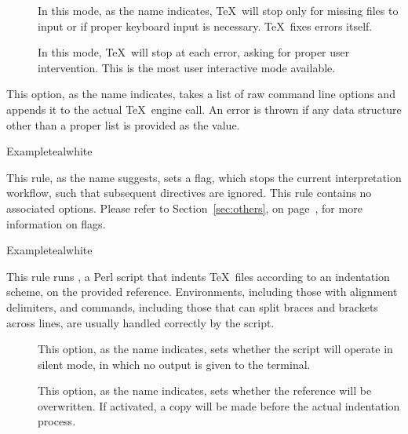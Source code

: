 \begin{description}
\begin{description}
\begin{description}
\item[] In this mode, as the name indicates, \TeX\ will stop only for missing files to input or if proper keyboard input is necessary. \TeX\ fixes errors itself.

\item[] In this mode, \TeX\ will stop at each error, asking for proper user intervention. This is the most user interactive mode available.
\end{description}

\item[\abox{options}] This option, as the name indicates, takes a list of raw command line options and appends it to the actual \TeX\ engine call. An error is thrown if any data structure other than a proper list is provided as the value.
\end{description}

\begin{codebox}{Example}{teal}{\icnote}{white}
\end{codebox}

\item[\rulebox{halt}]
This rule, as the name suggests, sets a  flag, which stops the current interpretation workflow, such that subsequent directives are ignored. This rule contains no associated options. Please refer to Section~\ref{sec:others}, on page~\pageref{sec:others}, for more information on flags.

\begin{codebox}{Example}{teal}{\icnote}{white}
\end{codebox}

\item[\rulebox{indent}]
This rule runs , a Perl script that indents \TeX\ files according to an indentation scheme, on the provided  reference. Environments, including those with alignment delimiters, and commands, including those that can split braces and brackets across lines, are usually handled correctly by the script.

\begin{description}
\item[] This option, as the name indicates, sets whether the script will operate in silent mode, in which no output is given to the terminal.

\item[] This option, as the name indicates, sets whether the  reference will be overwritten. If activated, a copy will be made before the actual indentation process. 


\end{description}
\end{description}
